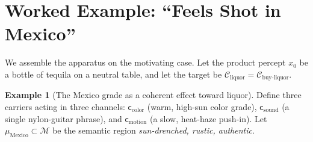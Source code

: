 \documentclass[twocolumn,11pt,a4paper]{article}
\theoremstyle{adv}
\theoremstyle{definition}
\newtheorem{example}[theorem]{Example}
\theoremstyle{remark}
\newcommand{\Cell}{\mathcal{C}}        %
\newcommand{\Carrier}{\kappa}         %
\renewcommand{\Carrier}{\mathsf{c}}
\newcommand{\Mean}{\mathcal{M}}        %
\begin{document}
\section{Worked Example: ``Feels Shot in Mexico''}
\label{sec:example}

We assemble the apparatus on the motivating case. Let the product percept
$x_0$ be a bottle of tequila on a neutral table, and let the target be
$\Cell_{\text{liquor}}=\Cell_{\text{buy-liquor}}$.

\begin{example}[The Mexico grade as a coherent effect toward liquor]
\label{ex:mexico}
Define three carriers acting in three channels:
$\Carrier_{\text{color}}$ (warm, high-sun color grade),
$\Carrier_{\text{sound}}$ (a single nylon-guitar phrase), and
$\Carrier_{\text{motion}}$ (a slow, heat-haze push-in). Let
$\mu_{\text{Mexico}}\subset\Mean$ be the semantic region
\emph{sun-drenched, rustic, authentic}.


\end{example}
\end{document}
